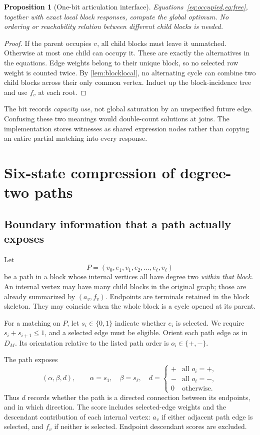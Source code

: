 \documentclass[11pt,letterpaper]{article}
\newtheorem{proposition}[proposition]{Proposition}\aliascntresetthe{proposition}
\theoremstyle{definition}
\theoremstyle{remark}
\begin{document}
\begin{proposition}[One-bit articulation interface]
\label{prop:onebit}
Equations~\cref{eq:occupied,eq:free}, together with exact local block responses, compute the global optimum. No ordering or reachability relation between different child blocks is needed.
\end{proposition}
\begin{proof}
If the parent occupies $v$, all child blocks must leave it unmatched. Otherwise at most one child can occupy it. These are exactly the alternatives in the equations. Edge weights belong to their unique block, so no selected row weight is counted twice. By \cref{lem:blocklocal}, no alternating cycle can combine two child blocks across their only common vertex. Induct up the block-incidence tree and use $f_v$ at each root.
\end{proof}

The bit records \emph{capacity use}, not global saturation by an unspecified future edge. Confusing these two meanings would double-count solutions at joins. The implementation stores witnesses as shared expression nodes rather than copying an entire partial matching into every response.

\section{Six-state compression of degree-two paths}
\label{sec:paths}

\subsection{Boundary information that a path actually exposes}
Let
\[
 P=(v_0,e_1,v_1,e_2,\ldots,e_\ell,v_\ell)
\]
be a path in a block whose internal vertices all have degree two \emph{within that block}. An internal vertex may have many child blocks in the original graph; those are already summarized by $(a_v,f_v)$. Endpoints are terminals retained in the block skeleton. They may coincide when the whole block is a cycle opened at its parent.

For a matching on $P$, let $s_i\in\{0,1\}$ indicate whether $e_i$ is selected. We require $s_i+s_{i+1}\le1$, and a selected edge must be eligible. Orient each path edge as in $D_M$. Its orientation relative to the listed path order is $o_i\in\{+,-\}$.

The path exposes
\begin{equation}
 (\alpha,\beta,d),\qquad
 \alpha=s_1,\quad\beta=s_\ell,\quad
 d=\begin{cases}
 +&\text{all }o_i=+,\\
 -&\text{all }o_i=-,\\
 0&\text{otherwise.}
 \end{cases}
 \label{eq:pathstate}
\end{equation}
Thus $d$ records whether the path is a directed connection between its endpoints, and in which direction. The score includes selected-edge weights and the descendant contribution of each internal vertex: $a_v$ if either adjacent path edge is selected, and $f_v$ if neither is selected. Endpoint descendant scores are excluded.
\end{document}
